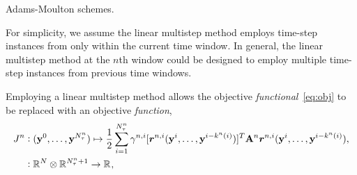 Adams-Moulton schemes. 
\begin{remark}\label{remark:LMS}
For simplicity, we assume the linear multistep method employs time-step instances from only within the current time window. In general, the linear multistep method at the $n$th window could be designed to employ multiple time-step instances from previous time windows.
\end{remark}
Employing a linear multistep method allows the objective \textit{functional}~\eqref{eq:obj} to be replaced with an objective \textit{function},
\begin{equation}\label{eq:obj_lms}
\begin{split} 
\objectiveArgLMS{n} &\vcentcolon (\stateyDiscreteArgnt{0},\ldots,\stateyDiscreteArgnt{\nstepsArg{n}}) \mapsto
\frac{1}{2} \sum_{i=1}^{\nstepsArg{n}} \quadWeightsLMSScalarArg{n}{i} [\residArg{n,i}(\stateyDiscreteArgnt{i},\ldots, \stateyDiscreteArgnt{i-k^n(i)})]^T  \stweightingMatArgt{n}{\timeWindowArg{n}{i}} \residArg{n,i}(\stateyDiscreteArgnt{i},\ldots, \stateyDiscreteArgnt{i-k^n(i)}), \\
&\vcentcolon \RR{\fomdim} \otimes \RR{\nstepsArg{n}+1} \rightarrow
\RR{}, 
\end{split}
\end{equation}
